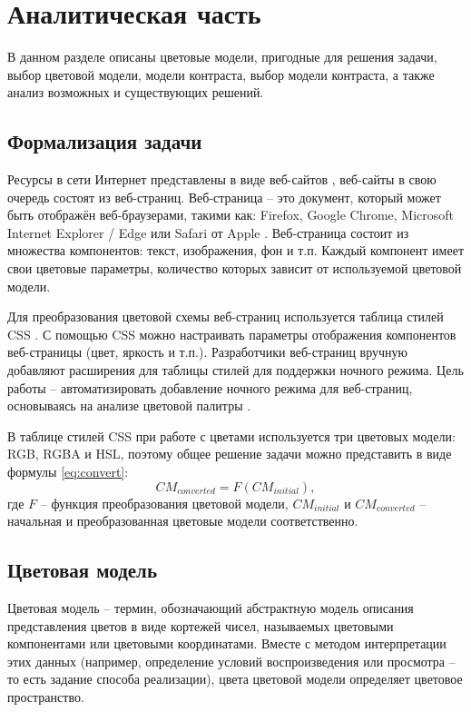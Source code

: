 \chapter{Аналитическая часть}

В данном разделе описаны цветовые модели, пригодные для решения задачи, выбор цветовой модели, модели контраста, выбор модели контраста, а также анализ возможных и существующих решений.

\section{Формализация задачи}

Ресурсы в сети Интернет представлены в виде веб-сайтов \cite{webpage}, веб-сайты в свою очередь состоят из веб-страниц. Веб-страница -- это документ, который может быть отображён веб-браузерами, такими как: Firefox, Google Chrome, Microsoft Internet Explorer / Edge или Safari от Apple \cite{webpage}. Веб-страница состоит из множества компонентов: текст, изображения, фон и т.п. Каждый компонент имеет свои цветовые параметры, количество которых зависит от используемой цветовой модели.

Для преобразования цветовой схемы веб-страниц используется таблица стилей CSS \cite{css}. С помощью CSS можно настраивать параметры отображения компонентов веб-страницы (цвет, яркость и т.п.). Разработчики веб-страниц вручную добавляют расширения для таблицы стилей для поддержки ночного режима. Цель работы -- автоматизировать добавление ночного режима для веб-страниц, основываясь на анализе цветовой палитры \cite{colorpalette}.

В таблице стилей CSS при работе с цветами используется три цветовых модели: RGB, RGBA и HSL, поэтому общее решение задачи можно представить в виде формулы \ref{eq:convert}:
\begin{equation}
	\label{eq:convert}
	CM_{converted} = F(CM_{initial}),
\end{equation}
где $F$ -- функция преобразования цветовой модели, $CM_{initial}$ и $CM_{converted}$ -- начальная и преобразованная цветовые модели соответственно.

\section{Цветовая модель}

Цветовая модель -- термин, обозначающий абстрактную модель описания представления цветов в виде кортежей чисел, называемых цветовыми компонентами или цветовыми координатами. Вместе с методом интерпретации этих данных (например, определение условий воспроизведения или просмотра -- то есть задание способа реализации), цвета цветовой модели определяет цветовое пространство.

